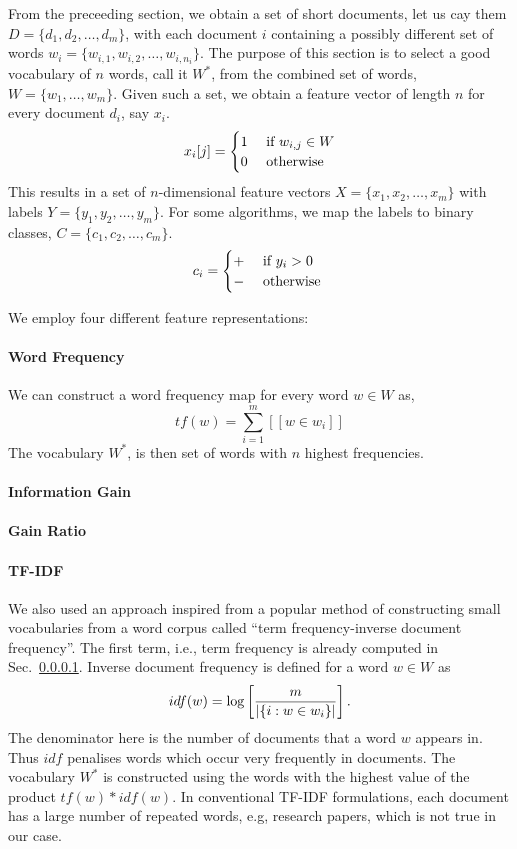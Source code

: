 \documentclass[11pt, letterpaper, conference, final, twocolumn]{ieeeconf}
\begin{document}
From the preceeding section, we obtain a set of short documents, let us cay them $D = \{d_1, d_2, \ldots, d_m\}$, with each document $i$ containing a possibly different set of words $w_{i} = \{w_{i,1}, w_{i, 2}, \ldots, w_{i, n_i} \}$. The purpose of this section is to select a good vocabulary of $n$ words, call it $W^*$, from the combined set of words, $W = \{w_1, \ldots, w_m\}$. Given such a set, we obtain a feature vector of length $n$ for every document $d_i$, say $x_i$.
$$
x_i[j] = \begin{cases}
	1 & \textrm{ if } w_{i,j} \in W \\
	0 & \textrm{ otherwise }
\end{cases}
$$
This results in a set of $n$-dimensional feature vectors $X = \{ x_1, x_2, \ldots, x_m \}$ with labels $Y = \{y_1, y_2, \ldots, y_m \}$. For some algorithms, we map the labels to binary classes, $C = \{c_1, c_2, \ldots, c_m \}$.
$$
c_i = \begin{cases}
	+ & \textrm{ if } y_i > 0 \\
	- & \textrm{ otherwise }
\end{cases}
$$

We employ four different feature representations:
\paragraph{Word Frequency}
\label{ssec:wf}
We can construct a word frequency map for every word $w \in W$ as,
$$
tf(w) = \sum_{i=1}^m [[ w \in w_i ]]
$$
The vocabulary $W^*$, is then set of words with $n$ highest frequencies.

\paragraph{Information Gain}
\label{ssec:ig}

\paragraph{Gain Ratio}
\label{ssec:gr}

\paragraph{TF-IDF}
\label{ssec:tfidf}
We also used an approach inspired from a popular method of constructing small vocabularies from a word corpus called ``term frequency-inverse document frequency''. The first term, i.e., term frequency is already computed in Sec.~\ref{ssec:wf}. Inverse document frequency is defined for a word $w \in W$ as
$$
idf(w) = \log \left[ \frac{m}{\left| \{i: w \in w_i \} \right|} \right].
$$
The denominator here is the number of documents that a word $w$ appears in. Thus $idf$ penalises words which occur very frequently in documents. The vocabulary $W^*$ is constructed using the words with the highest value of the product $tf(w) * idf(w)$. In conventional TF-IDF formulations, each document has a large number of repeated words, e.g, research papers, which is not true in our case.
\end{document}
